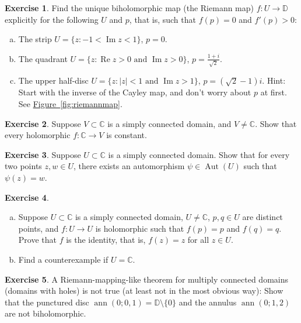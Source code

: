 \documentclass[12pt,openany]{book}
\newcommand{\ann}{\operatorname{ann}}
\renewcommand{\Re}{\operatorname{Re}}
\renewcommand{\Im}{\operatorname{Im}}
\newcommand{\Aut}{\operatorname{Aut}}
\newcommand{\sabs}[1]{\lvert {#1} \rvert}
\newcommand{\C}{{\mathbb{C}}}
\newcommand{\D}{{\mathbb{D}}}
\theoremstyle{plain}
\theoremstyle{remark}
\theoremstyle{definition}
\newenvironment{exbox}{%
    \def\FrameCommand{\vrule width 1pt \relax\hspace{10pt}}%
    \MakeFramed{\advance\hsize-\width\FrameRestore}%
}{%
    \endMakeFramed
}
\newenvironment{exparts}{%
    \leavevmode\begin{enumerate}[a),noitemsep,topsep=0pt,parsep=0pt,partopsep=0pt]
}{%
    \end{enumerate}
}
\theoremstyle{exercise}
\newtheorem{exercise}{Exercise}[section]
\theoremstyle{example}
\newcommand{\figureref}[1]{\hyperref[#1]{Figure~\ref*{#1}}}
\begin{document}
\begin{exbox}
\begin{exercise} \label{exercise:explicitriemann}
Find the unique biholomorphic map (the Riemann map)
$f \colon U \to \D$ explicitly
for the following $U$ and $p$, that is,
such that $f(p) = 0$ and $f'(p) > 0$:
\begin{exparts}
\item
The strip $U = \{ z : -1 < \Im z < 1 \}$, $p=0$.
\item
The quadrant $U = \{ z : \Re z > 0 \text{ and } \Im z > 0 \}$,
$p=\frac{1+i}{\sqrt{2}}$.
\item
The upper half-disc $U = \{ z : \sabs{z} < 1 \text{ and } \Im z > 1 \}$, $p
= (\sqrt{2}-1)i$.  Hint:  Start with the inverse of the Cayley map, and
don't worry about $p$ at first.  See \figureref{fig:riemannmap}.
\end{exparts}
\end{exercise}

\begin{exercise}
Suppose $V \subset \C$ is a simply connected domain, and $V \not= \C$.
Show that every holomorphic $f \colon \C \to V$ is constant.
\end{exercise}

\begin{exercise}
Suppose $U \subset \C$ is a simply connected domain.
Show that for every two points $z,w \in U$, there exists an automorphism
$\psi \in \Aut(U)$ such that $\psi(z) = w$.
\end{exercise}


\begin{exercise}
\begin{exparts}
\item
Suppose $U \subset \C$ is a simply connected domain, $U \not= \C$,
$p,q \in U$ are distinct points, and
$f \colon U \to U$ is holomorphic such that $f(p) = p$ and $f(q)=q$.
Prove that $f$ is the identity, that is, $f(z)=z$ for all $z \in U$.
\item
Find a counterexample if $U=\C$.
\end{exparts}
\end{exercise}

\begin{exercise}
A Riemann-mapping-like theorem for multiply connected domains (domains with
holes) is not true
(at least not in the most obvious way):
Show that the punctured disc $\ann(0;0,1) = \D \setminus \{ 0 \}$
and the annulus $\ann(0;1,2)$ are not biholomorphic.
\end{exercise}


\end{exbox}
\end{document}
